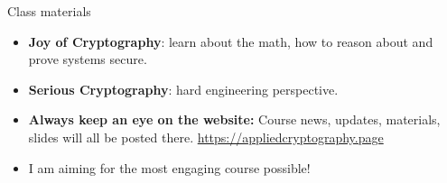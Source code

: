 \documentclass[aspectratio=169, lualatex, handout]{beamer}
\begin{document}
	\begin{frame}{Class materials}
		\begin{itemize}
			\item \textbf{Joy of Cryptography}: learn about the math, how to reason
				about and prove systems secure.

			\item \textbf{Serious Cryptography}: hard engineering perspective.
				\vspace{1cm}

			\item \textbf{Always keep an eye on the website:} Course news, updates,
				materials, slides will all be posted there.
				\url{https://appliedcryptography.page}

			\item I am aiming for the most engaging course possible!
		\end{itemize}
	\end{frame}

	\begin{frame}[plain]
		\titlepage
	\end{frame}
\end{document}
